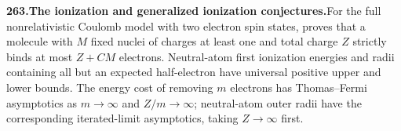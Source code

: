 \documentclass[11pt,a4paper]{article}
\begin{document}
  \par \begin{minipage}{\linewidth}
  \fontsize{10.5}{12.6}\selectfont\RaggedRight
  \hypertarget{result 263}{}
  {\bfseries\textcolor{muted}{263.}\enspace The ionization and generalized ionization conjectures.}\enspace For the full nonrelativistic Coulomb model with two electron spin states, proves that a molecule with $M$ fixed nuclei of charges at least one and total charge $Z$ strictly binds at most $Z+CM$ electrons. Neutral-atom first ionization energies and radii containing all but an expected half-electron have universal positive upper and lower bounds. The energy cost of removing $m$ electrons has Thomas--Fermi asymptotics as $m\to\infty$ and $Z/m\to\infty$; neutral-atom outer radii have the corresponding iterated-limit asymptotics, taking $Z\to\infty$ first.\par
  \end{minipage}\par\vspace{5pt}
\end{document}

